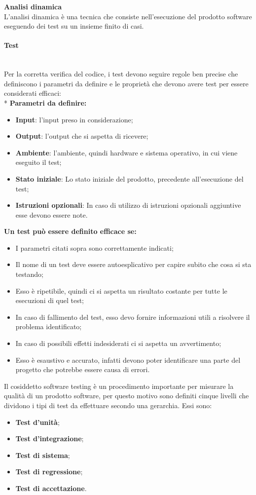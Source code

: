 \textbf{Analisi dinamica} \\ [1mm]
L'analisi dinamica è una tecnica che consiste nell'esecuzione del prodotto software eseguendo dei test su un insieme finito di casi.
\paragraph{Test}\mbox{}\\
Per la corretta verifica del codice, i test devono seguire regole ben precise che definiscono i parametri da definire e le proprietà che devono avere test per essere considerati efficaci: \\*
\textbf{Parametri da definire:}
\begin{itemize}
	\item \textbf{Input}: l'input preso in considerazione;
	\item \textbf{Output}: l'output che si aspetta di ricevere;
	\item \textbf{Ambiente}: l'ambiente, quindi hardware e sistema operativo, in cui viene eseguito il test;
	\item \textbf{Stato iniziale}: Lo stato iniziale del prodotto, precedente all'esecuzione del test;
	\item \textbf{Istruzioni opzionali}: In caso di utilizzo di istruzioni opzionali aggiuntive esse devono essere note.
\end{itemize} 
\textbf{Un test può essere definito efficace se:}
\begin{itemize}
	\item I parametri citati sopra sono correttamente indicati;
	\item Il nome di un test deve essere autoesplicativo per capire subito che cosa si sta testando;
	\item Esso è ripetibile, quindi ci si aspetta un risultato costante per tutte le esecuzioni di quel test;
	\item In caso di fallimento del test, esso devo fornire informazioni utili a risolvere il problema identificato;
	\item In caso di possibili effetti indesiderati ci si aspetta un avvertimento;
	\item Esso è esaustivo e accurato, infatti devono poter identificare una parte del progetto che potrebbe essere causa di errori.
\end{itemize}
Il cosiddetto software testing è un procedimento importante per misurare la qualità di un prodotto software, per questo motivo sono definiti cinque livelli che dividono i tipi di test da effettuare secondo una gerarchia. Essi sono: 
\begin{itemize}
	\item \textbf{Test d'unità};
	\item \textbf{Test d'integrazione};
	\item \textbf{Test di sistema};
	\item \textbf{Test di regressione};
	\item \textbf{Test di accettazione}.
\end{itemize}

